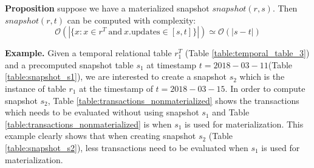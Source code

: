 \textbf{Proposition} suppose we have a materialized snapshot $snapshot(r,s)$. Then $snapshot(r,t)$ can be computed with complexity:
$$\mathcal{O}(|\{x: x\in r^T\mathrm{\ and\ } x.\mathrm{updates} \in [s,t]\}|) \simeq \mathcal{O}(|s-t|)$$

\textbf{Example.} Given a temporal relational table $r_1^T$ (Table \ref{table:temporal_table_3}) and a precomputed snapshot table $s_1$ at timestamp $t = 2018-03-11$(Table \ref{table:snapshot_s1}), we are interested to create a snapshot $s_2$ which is the instance of table $r_1$ at the timestamp of $t = 2018-03-15$. In order to compute snapshot $s_2$, Table \ref{table:transactions_nonmaterialized} shows the transactions which needs to be evaluated without using snapshot $s_1$ and Table \ref{table:transactions_nonmaterialized} is when $s_1$ is used for materialization. This example clearly shows that when creating snapshot $s_2$ (Table \ref{table:snapshot_s2}), less transactions need to be evaluated when $s_1$ is used for materialization.

